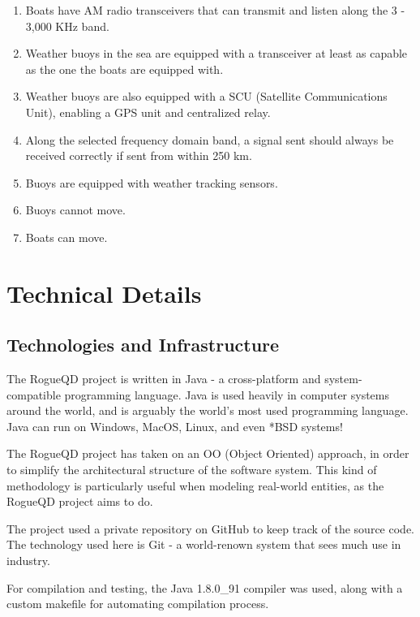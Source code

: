 \documentclass{article}
\begin{document}
	\begin{enumerate}
		\item Boats have AM radio transceivers that can transmit and listen along the 3 - 3,000 KHz band.
		\item Weather buoys in the sea are equipped with a transceiver at least as capable as the one the boats are equipped with.
		\item Weather buoys are also equipped with a SCU (Satellite Communications Unit), enabling a GPS unit and centralized relay.
		\item Along the selected frequency domain band, a signal sent should always be received correctly if sent from within 250 km.
		\item Buoys are equipped with weather tracking sensors.
		\item Buoys cannot move.
		\item Boats can move.
	\end{enumerate}


\section{Technical Details} %

	\subsection{Technologies and Infrastructure}

		The RogueQD project is written in Java - a cross-platform and system-compatible programming language. Java is used heavily in computer systems around the world, and is arguably the world's most used programming language. Java can run on Windows, MacOS, Linux, and even *BSD systems!

		\bigskip

		The RogueQD project has taken on an OO (Object Oriented) approach, in order to simplify the architectural structure of the software system. This kind of methodology is particularly useful when modeling real-world entities, as the RogueQD project aims to do.

		\bigskip

		The project used a private repository on GitHub to keep track of the source code. The technology used here is Git - a world-renown system that sees much use in industry.

		\bigskip

		For compilation and testing, the Java 1.8.0\_91 compiler was used, along with a custom makefile for automating compilation process.
\end{document}
